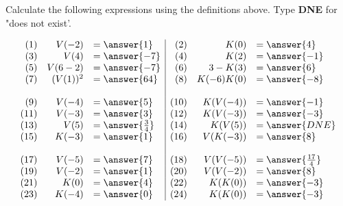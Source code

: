 \documentclass{ximera}
\begin{document}
\begin{question}


Calculate the following expressions using the definitions above. Type \textbf{DNE} for "does not exist'.


\[
\begin{array}{rrl|rrl}
(1) & V(-2)  & = \answer{1} &  (2) &  K(0) & =\answer{4} \\
(3) & V(4)  & = \answer{-7} &  (4) &  K(2) & =\answer{-1} \\
(5) & V(6-2)  & = \answer{-7} &  (6) &  3-K(3) & =\answer{6} \\
(7) & (V(1))^2  & = \answer{64} &  (8) &  K(-6)K(0) & =\answer{-8} \\
    &           &               &      &            & \\
(9) & V(-4)  & = \answer{5} &  (10) &  K(V(-4)) & =\answer{-1} \\
(11) & V(-3)  & = \answer{3} &  (12) &  K(V(-3)) & =\answer{-3} \\
(13) & V(5)  & = \answer{\frac{3}{4}} &  (14) &  K(V(5)) & =\answer{DNE} \\
(15) & K(-3)  & = \answer{1} &  (16) &  V(K(-3)) & =\answer{8} \\
     &        &              &       &           & \\
(17) & V(-5)  & = \answer{7} &  (18) &  V(V(-5)) & =\answer{\frac{17}{4}} \\
(19) & V(-2)  & = \answer{1} &  (20) &  V(V(-2)) & =\answer{8} \\
(21) & K(0)  & = \answer{4} &  (22) &  K(K(0)) & =\answer{-3} \\
(23) & K(-4)  & = \answer{0} &  (24) &  K(K(0)) & =\answer{-3} 
\end{array}
\]


\end{question}
\end{document}
